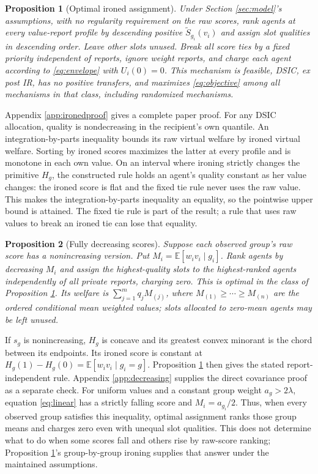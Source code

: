 \documentclass[11pt]{article}
\newtheorem{proposition}{Proposition}
\newcommand{\E}{\mathbb E}
\begin{document}
\begin{proposition}[Optimal ironed assignment]\label{prop:ironed}
Under Section \ref{sec:model}'s assumptions, with no regularity requirement on the raw scores, rank agents at every value-report profile by descending positive $\widetilde S_{g_i}(v_i)$ and assign slot qualities in descending order. Leave other slots unused. Break all score ties by a fixed priority independent of reports, ignore weight reports, and charge each agent according to \eqref{eq:envelope} with $U_i(0)=0$. This mechanism is feasible, DSIC, ex post IR, has no positive transfers, and maximizes \eqref{eq:objective} among all mechanisms in that class, including randomized mechanisms.
\end{proposition}

Appendix \ref{app:ironedproof} gives a complete paper proof. For any DSIC allocation, quality is nondecreasing in the recipient's own quantile. An integration-by-parts inequality bounds its raw virtual welfare by ironed virtual welfare. Sorting by ironed scores maximizes the latter at every profile and is monotone in each own value. On an interval where ironing strictly changes the primitive $H_g$, the constructed rule holds an agent's quality constant as her value changes: the ironed score is flat and the fixed tie rule never uses the raw value. This makes the integration-by-parts inequality an equality, so the pointwise upper bound is attained. The fixed tie rule is part of the result; a rule that uses raw values to break an ironed tie can lose that equality.

\begin{proposition}[Fully decreasing scores]\label{prop:decreasing}
Suppose each observed group's raw score has a nonincreasing version. Put $M_i=\E[w_i v_i\mid g_i]$. Rank agents by decreasing $M_i$ and assign the highest-quality slots to the highest-ranked agents independently of all private reports, charging zero. This is optimal in the class of Proposition \ref{prop:ironed}. Its welfare is $\sum_{j=1}^m q_j M_{(j)}$, where $M_{(1)}\ge\cdots\ge M_{(n)}$ are the ordered conditional mean weighted values; slots allocated to zero-mean agents may be left unused.
\end{proposition}

If $s_g$ is nonincreasing, $H_g$ is concave and its greatest convex minorant is the chord between its endpoints. Its ironed score is constant at $H_g(1)-H_g(0)=\E[w_i v_i\mid g_i=g]$. Proposition \ref{prop:ironed} then gives the stated report-independent rule. Appendix \ref{app:decreasing} supplies the direct covariance proof as a separate check. For uniform values and a constant group weight $a_g>2\lambda$, equation \eqref{eq:linear} has a strictly falling score and $M_i=a_{g_i}/2$. Thus, when every observed group satisfies this inequality, optimal assignment ranks those group means and charges zero even with unequal slot qualities. This does not determine what to do when some scores fall and others rise by raw-score ranking; Proposition \ref{prop:ironed}'s group-by-group ironing supplies that answer under the maintained assumptions.
\end{document}
